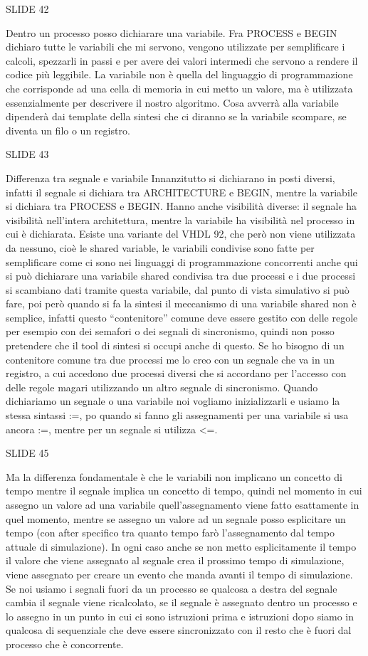 \documentclass[10pt,a4paper,titlepage]{article}
\begin{document}
SLIDE 42

Dentro un processo posso dichiarare una variabile. Fra PROCESS e BEGIN dichiaro tutte le variabili che mi servono, vengono utilizzate per semplificare i calcoli, spezzarli in passi e per avere dei valori intermedi che servono a rendere il codice più leggibile. La variabile non è quella del linguaggio di programmazione che corrisponde ad una cella di memoria in cui metto un valore, ma è utilizzata essenzialmente per descrivere il nostro algoritmo. Cosa avverrà alla variabile dipenderà dai template della sintesi che ci diranno se la variabile scompare, se diventa un filo o un registro.

SLIDE 43

Differenza tra segnale e variabile
Innanzitutto si dichiarano in posti diversi, infatti il segnale si dichiara tra ARCHITECTURE e BEGIN, mentre la variabile si dichiara tra PROCESS e BEGIN. Hanno anche visibilità diverse: il segnale ha visibilità nell’intera architettura, mentre la variabile ha visibilità nel processo in cui è dichiarata. Esiste una variante del VHDL 92, che però non viene utilizzata da nessuno, cioè le shared variable, le variabili condivise sono fatte per semplificare come ci sono nei linguaggi di programmazione concorrenti anche qui si può dichiarare una variabile shared condivisa tra due processi e i due processi si scambiano dati tramite questa variabile, dal punto di vista simulativo si può fare, poi però quando si fa la sintesi il meccanismo di una variabile shared non è semplice, infatti questo “contenitore” comune deve essere gestito con delle regole per esempio con dei semafori o dei segnali di sincronismo, quindi non posso pretendere che il tool di sintesi si occupi anche di questo. Se ho bisogno di un contenitore comune tra due processi me lo creo con un segnale che va in un registro, a cui accedono due processi diversi che si accordano per l’accesso con delle regole magari utilizzando un altro segnale di sincronismo. Quando dichiariamo un segnale o una variabile noi vogliamo inizializzarli e usiamo la stessa sintassi :=, po quando si fanno gli assegnamenti per una variabile si usa ancora :=, mentre per un segnale si utilizza <=. 

SLIDE 45

Ma la differenza fondamentale è che le variabili non implicano un concetto di tempo mentre il segnale implica un concetto di tempo, quindi nel momento in cui assegno un valore ad una variabile quell’assegnamento viene fatto esattamente in quel momento, mentre se assegno un valore ad un segnale posso esplicitare un tempo (con after specifico tra quanto tempo farò l’assegnamento dal tempo attuale di simulazione). In ogni caso anche se non metto esplicitamente il tempo il valore che viene assegnato al segnale crea il prossimo tempo di simulazione, viene assegnato per creare un evento che manda avanti il tempo di simulazione. Se noi usiamo i segnali fuori da un processo se qualcosa a destra del segnale cambia il segnale viene ricalcolato, se il segnale è assegnato dentro un processo e lo assegno in un punto in cui ci sono istruzioni prima e istruzioni dopo siamo in qualcosa di sequenziale che deve essere sincronizzato con il resto che è fuori dal processo che è concorrente.
\end{document}
